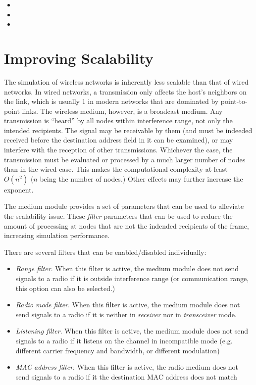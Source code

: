 \begin{itemize}
  \item {}
  \item {}
  \item {}
\end{itemize}


\section{Improving Scalability}
\label{sec:medium:improving-scalability}

The simulation of wireless networks is inherently less scalable than
that of wired networks. In wired networks, a transmission only affects
the host's neighbors on the link, which is usually 1 in modern networks
that are dominated by point-to-point links. The wireless medium, however,
is a broadcast medium. Any transmission is ``heard'' by all nodes
within interference range, not only the intended recipients.
The signal may be receivable by them (and must be indeeded received
before the destination address field in it can be examined),
or may interfere with the reception of other transmissions.
Whichever the case, the transmission must be evaluated or processed
by a much larger number of nodes than in the wired case.
This makes the computational complexity at least $O(n^2)$ ($n$ being
the number of nodes.) Other effects may further increase the exponent.

The medium module provides a set of parameters that can be used
to alleviate the scalability issue. These \textit{filter} parameters
that can be used to reduce the amount of processing at nodes that are
not the indended recipients of the frame, increasing simulation performance.

There are several filters that can be enabled/disabled individually:

\begin{itemize}
  \item \textit{Range filter}. When this filter is active, the medium module
    does not send signals to a radio if it is outside interference range
    (or communication range, this option can also be selected.)
  \item \textit{Radio mode filter}. When this filter is active,
    the medium module does not send signals to a radio if it is neither
    in \textit{receiver} nor in \textit{transceiver} mode.
  \item \textit{Listening filter}. When this filter is active, the medium module
    does not send signals to a radio if it listens on the channel in
    incompatible mode (e.g. different carrier frequency and bandwidth,
    or different modulation)
  \item \textit{MAC address filter}. When this filter is active, the radio medium
    does not send signals to a radio if it the destination MAC address
    does not match
\end{itemize}

